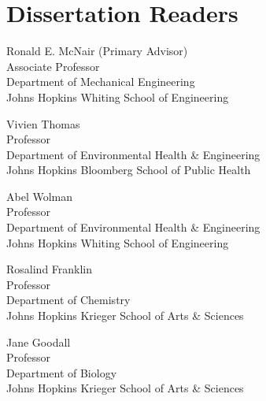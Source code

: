 \chapter*{Dissertation Readers}

\begin{singlespace}

\noindent Ronald E. McNair (Primary Advisor)\\
\indent Associate Professor\\
\indent Department of Mechanical Engineering\\
\indent Johns Hopkins Whiting School of Engineering\\
\medskip

\noindent Vivien Thomas\\
\indent Professor\\
\indent Department of Environmental Health \& Engineering\\
\indent Johns Hopkins Bloomberg School of Public Health\\
\medskip

\noindent Abel Wolman\\
\indent Professor \\
\indent Department of Environmental Health \& Engineering\\
\indent Johns Hopkins Whiting School of Engineering\\
\medskip

\noindent Rosalind Franklin\\
\indent Professor\\
\indent Department of Chemistry\\
\indent Johns Hopkins Krieger School of Arts \& Sciences\\
\medskip

\noindent Jane Goodall\\
\indent Professor\\
\indent Department of Biology\\
\indent Johns Hopkins Krieger School of Arts \& Sciences\\
\medskip 

\end{singlespace}

\newpage 